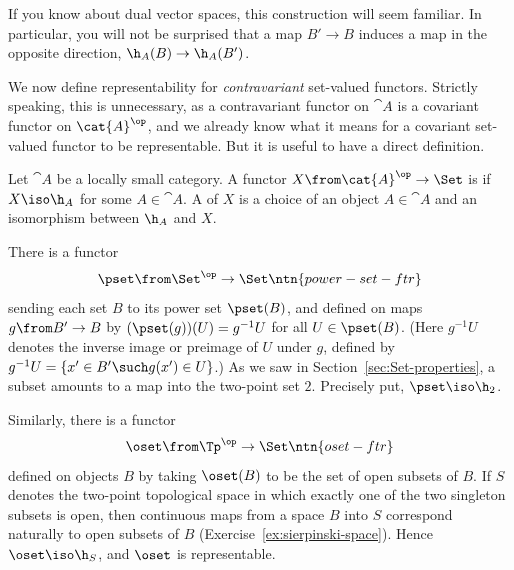 If you know about dual vector spaces, this construction will seem familiar.
In particular, you will not be surprised that a map $B' \to B$ induces a
map in the opposite direction, $\h_A(B) \to \h_A(B')$.

We now define representability for \emph{contravariant} set-valued
functors.  Stri\-ctly speaking, this is unnecessary, as a contravariant
functor on $\cat{A}$ is a covariant functor on $\cat{A}^\op$, and we
already know what it means for a covariant set-valued functor to be
representable.  But it is useful to have a direct definition.

\begin{defn}\label{defn:contra-repr-func}
Let $\cat{A}$ be a locally small category.  A functor $X\from \cat{A}^\op \to
\Set$ is %
%
%
if $X \iso \h_A$ for some $A \in \cat{A}$.  A %
%
%
of $X$ is a choice of an object $A \in \cat{A}$ and an isomorphism between
$\h_A$ and $X$.
\end{defn}

\begin{example}        
There is a functor
\[
\pset\from \Set^\op \to \Set%
%
\ntn{power-set-ftr}
%
\]
sending each set $B$ to its power%
%
%
set $\pset(B)$, and defined on maps $g\from B' \to B$ by $(\pset(g))(U) =
g^{-1}U$ for all $U \in \pset(B)$.  (Here $g^{-1}U$ denotes the inverse%
%
%
image or preimage of $U$ under $g$, defined by $g^{-1} U = \{ x' \in B'
\such g(x') \in U \}$.)  As we saw in Section~\ref{sec:Set-properties}, a
subset amounts to a map into the two-point%
%
%
set $2$.  Precisely put, $\pset \iso \h_2$.
\end{example}

\begin{example}
\label{eg:contra-rep-sier}
Similarly, there is a functor
\[
\oset\from\Tp^\op \to \Set%
%
\ntn{oset-ftr}
%
\index{topological space!open subset of}%
\index{open subset}%
\index{set!open}
%
\]
defined on objects $B$ by taking $\oset(B)$ to be the set of open subsets
of $B$.  If $S$ denotes the two-point%
%
%
topological space in which exactly one of the two singleton subsets is
open, then continuous maps from a space $B$ into $S$ correspond naturally
to open subsets of $B$ (Exercise~\ref{ex:sierpinski-space}).  Hence $\oset
\iso \h_S$, and $\oset$ is representable.
\end{example}

